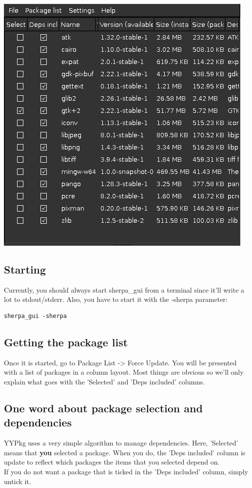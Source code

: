 \documentclass[a4paper]{article}
\begin{document}
\begin{center}
  \includegraphics{sherpa_gui_1.png}
\end{center}

\subsection{Starting}
Currently, you should always start sherpa\_gui from a terminal since it'll write a lot to stdout/stderr. Also, you have to start it with the -sherpa parameter:
\begin{verbatim}
sherpa_gui -sherpa
\end{verbatim}

\subsection{Getting the package list}
Once it is started, go to Package List -> Force Update. You will be presented with a list of packages in a column layout. Most things are obvious so we'll only explain what goes with the 'Selected' and 'Deps included' columns.

\subsection{One word about package selection and dependencies}
YYPkg uses a very simple algorithm to manage dependencies.  Here, 'Selected' means that {\bf you} selected a package. When you do, the 'Deps included' column is update to reflect which packages the items that you selected depend on.\\
If you do not want a package that is ticked in the 'Deps included' column, simply untick it.\\
\end{document}
